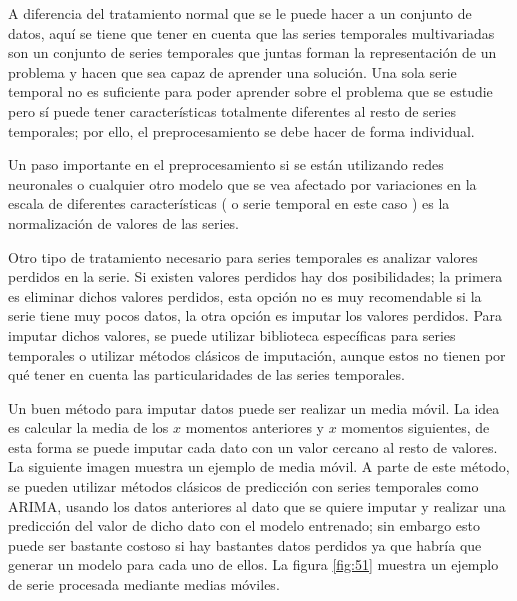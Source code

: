A diferencia del tratamiento normal que se le puede hacer a  un conjunto de datos, aquí se tiene que tener en cuenta que las series temporales multivariadas son un conjunto de series temporales que juntas forman la representación de un problema y hacen que sea capaz de aprender una solución. Una sola serie temporal no es suficiente para poder aprender sobre el problema que se estudie pero sí puede tener características totalmente diferentes al resto de series temporales; por ello, el preprocesamiento se debe hacer de forma individual.\newline

Un paso importante en el preprocesamiento si se están utilizando redes neuronales o cualquier otro modelo que se vea afectado por variaciones en la escala de diferentes características ( o serie temporal en este caso ) es la normalización de valores de las series.\newline

Otro tipo de tratamiento necesario para series temporales es analizar valores perdidos en la serie. Si existen valores perdidos hay dos posibilidades; la primera es eliminar dichos valores perdidos, esta opción no es muy recomendable si la serie tiene muy pocos datos, la otra opción es imputar los valores perdidos. Para imputar dichos valores, se puede utilizar biblioteca específicas para series temporales o utilizar métodos clásicos de imputación, aunque estos no tienen por qué tener en cuenta las particularidades de las series temporales.\newline

Un buen método para imputar datos puede ser realizar un media móvil. La idea es calcular la media de los $x$ momentos anteriores y $x$ momentos siguientes, de esta forma se puede imputar cada dato con un valor cercano al resto de valores. La siguiente imagen muestra un ejemplo de media móvil. A parte de este método, se pueden utilizar métodos clásicos de predicción con series temporales como ARIMA, usando los datos anteriores al dato que se quiere imputar y realizar una predicción del valor de dicho dato con el modelo entrenado; sin embargo esto puede ser bastante costoso si hay bastantes datos perdidos ya que habría que generar un modelo para cada uno de ellos. La figura \ref{fig:51} muestra un ejemplo de serie procesada mediante medias móviles.\newline


